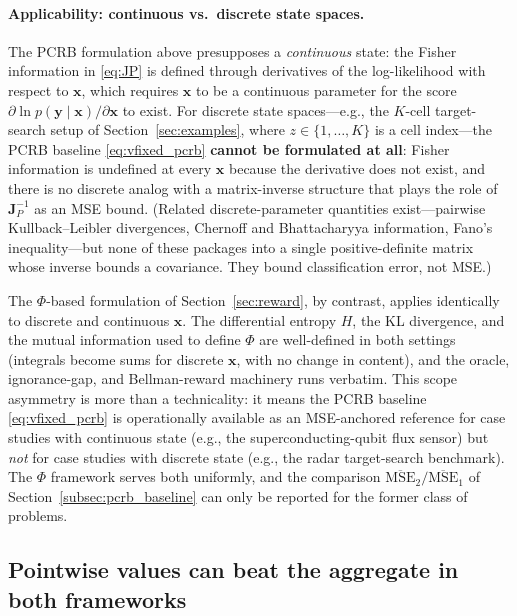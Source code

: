 \documentclass[11pt,a4paper]{article}
\begin{document}
\paragraph{Applicability: continuous vs.\ discrete state spaces.}
The PCRB formulation above presupposes a \emph{continuous} state: the Fisher information in \eqref{eq:JP} is defined through derivatives of the log-likelihood with respect to $\bm{x}$, which requires $\bm{x}$ to be a continuous parameter for the score $\partial \ln p(\bm{y} \mid \bm{x}) / \partial \bm{x}$ to exist.  For discrete state spaces---e.g., the $K$-cell target-search setup of Section~\ref{sec:examples}, where $z \in \{1, \ldots, K\}$ is a cell index---the PCRB baseline \eqref{eq:vfixed_pcrb} \textbf{cannot be formulated at all}: Fisher information is undefined at every $\bm{x}$ because the derivative does not exist, and there is no discrete analog with a matrix-inverse structure that plays the role of $\bm{J}_P^{-1}$ as an MSE bound.  (Related discrete-parameter quantities exist---pairwise Kullback--Leibler divergences, Chernoff and Bhattacharyya information, Fano's inequality---but none of these packages into a single positive-definite matrix whose inverse bounds a covariance.  They bound classification error, not MSE.)

The $\Phi$-based formulation of Section~\ref{sec:reward}, by contrast, applies identically to discrete and continuous $\bm{x}$.  The differential entropy $H$, the KL divergence, and the mutual information used to define $\Phi$ are well-defined in both settings (integrals become sums for discrete $\bm{x}$, with no change in content), and the oracle, ignorance-gap, and Bellman-reward machinery runs verbatim.  This scope asymmetry is more than a technicality: it means the PCRB baseline \eqref{eq:vfixed_pcrb} is operationally available as an MSE-anchored reference for case studies with continuous state (e.g., the superconducting-qubit flux sensor) but \emph{not} for case studies with discrete state (e.g., the radar target-search benchmark).  The $\Phi$ framework serves both uniformly, and the comparison $\overline{\mathrm{MSE}}_2/\overline{\mathrm{MSE}}_1$ of Section~\ref{subsec:pcrb_baseline} can only be reported for the former class of problems.

\subsection{Pointwise values can beat the aggregate in both frameworks}
\label{subsec:pointwise_both}
\end{document}
